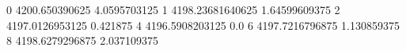 0 4200.650390625 4.0595703125
1 4198.23681640625 1.64599609375
2 4197.0126953125 0.421875
4 4196.5908203125 0.0
6 4197.7216796875 1.130859375
8 4198.6279296875 2.037109375
